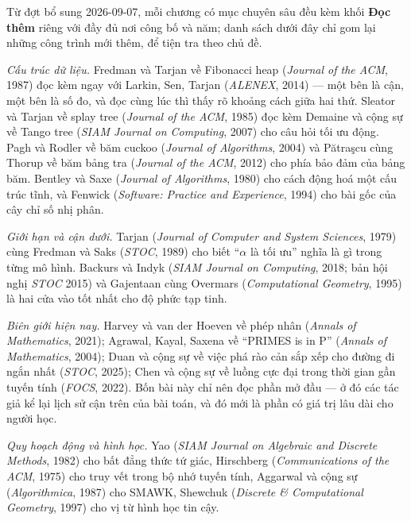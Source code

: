 \documentclass[algorithm.tex]{subfiles}
\begin{document}
Từ đợt bổ sung 2026-09-07, mỗi chương có mục chuyên sâu đều kèm khối \textbf{Đọc thêm} riêng với đầy đủ nơi công bố và năm; danh sách dưới đây chỉ gom lại những công trình mới thêm, để tiện tra theo chủ đề.

\emph{Cấu trúc dữ liệu.} Fredman và Tarjan về Fibonacci heap (\emph{Journal of the ACM}, 1987) đọc kèm ngay với Larkin, Sen, Tarjan (\emph{ALENEX}, 2014) --- một bên là cận, một bên là số đo, và đọc cùng lúc thì thấy rõ khoảng cách giữa hai thứ\cite{fredman1987,larkin2014}. Sleator và Tarjan về splay tree (\emph{Journal of the ACM}, 1985) đọc kèm Demaine và cộng sự về Tango tree (\emph{SIAM Journal on Computing}, 2007) cho câu hỏi tối ưu động\cite{sleator1985,demaine2007}. Pagh và Rodler về băm cuckoo (\emph{Journal of Algorithms}, 2004) và Pătraşcu cùng Thorup về băm bảng tra (\emph{Journal of the ACM}, 2012) cho phía bảo đảm của bảng băm\cite{pagh2004,patrascu2012}. Bentley và Saxe (\emph{Journal of Algorithms}, 1980) cho cách động hoá một cấu trúc tĩnh, và Fenwick (\emph{Software: Practice and Experience}, 1994) cho bài gốc của cây chỉ số nhị phân\cite{bentley1980,fenwick1994}.

\emph{Giới hạn và cận dưới.} Tarjan (\emph{Journal of Computer and System Sciences}, 1979) cùng Fredman và Saks (\emph{STOC}, 1989) cho biết ``\(\alpha\) là tối ưu'' nghĩa là gì trong từng mô hình\cite{tarjan1979,fredman1989}. Backurs và Indyk (\emph{SIAM Journal on Computing}, 2018; bản hội nghị \emph{STOC} 2015) và Gajentaan cùng Overmars (\emph{Computational Geometry}, 1995) là hai cửa vào tốt nhất cho độ phức tạp tinh\cite{backurs2018,gajentaan1995}.

\emph{Biên giới hiện nay.} Harvey và van der Hoeven về phép nhân  (\emph{Annals of Mathematics}, 2021); Agrawal, Kayal, Saxena về ``PRIMES is in P'' (\emph{Annals of Mathematics}, 2004); Duan và cộng sự về việc phá rào cản sắp xếp cho đường đi ngắn nhất (\emph{STOC}, 2025); Chen và cộng sự về luồng cực đại trong thời gian gần tuyến tính (\emph{FOCS}, 2022)\cite{harvey2021,aks2004,duan2025,chen2022}. Bốn bài này chỉ nên đọc phần mở đầu --- ở đó các tác giả kể lại lịch sử cận trên của bài toán, và đó mới là phần có giá trị lâu dài cho người học.

\emph{Quy hoạch động và hình học.} Yao (\emph{SIAM Journal on Algebraic and Discrete Methods}, 1982) cho bất đẳng thức tứ giác, Hirschberg (\emph{Communications of the ACM}, 1975) cho truy vết trong bộ nhớ tuyến tính, Aggarwal và cộng sự (\emph{Algorithmica}, 1987) cho SMAWK, Shewchuk (\emph{Discrete \& Computational Geometry}, 1997) cho vị từ hình học tin cậy\cite{yao1982,hirschberg1975,aggarwal1987,shewchuk1997}.
\end{document}

